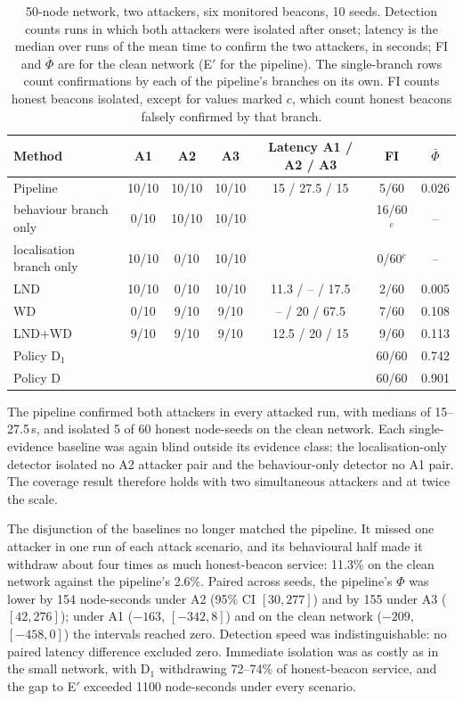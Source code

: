 \documentclass[pdflatex,sn-mathphys-num]{sn-jnl}%
\theoremstyle{thmstyleone}%
\theoremstyle{thmstyletwo}%
\theoremstyle{thmstylethree}%
\begin{document}
\begin{table}[!t]
\caption{50-node network, two attackers, six monitored beacons, 10 seeds.
Detection counts runs in which both attackers were isolated after onset;
latency is the median over runs of the mean time to confirm the two
attackers, in seconds; FI and $\bar\Phi$ are for the clean network (E$'$ for
the pipeline). The single-branch rows count confirmations by each of the
pipeline's branches on its own. FI counts honest beacons isolated, except for
values marked $c$, which count honest beacons falsely confirmed by that
branch.}
\label{tab:scale}
\centering
\footnotesize
\setlength{\tabcolsep}{4pt}
\begin{tabular}{@{}lcccccc@{}}
\toprule
Method & A1 & A2 & A3 & Latency A1 / A2 / A3 & FI & $\bar\Phi$ \\
\midrule
Pipeline & 10/10 & 10/10 & 10/10 & 15 / 27.5 / 15 & 5/60 & 0.026 \\
\quad behaviour branch only & 0/10 & 10/10 & 10/10 & & 16/60$^{c}$ & -- \\
\quad localisation branch only & 10/10 & 0/10 & 10/10 & & 0/60$^{c}$ & -- \\
LND & 10/10 & 0/10 & 10/10 & 11.3 / -- / 17.5 & 2/60 & 0.005 \\
WD & 0/10 & 9/10 & 9/10 & -- / 20 / 67.5 & 7/60 & 0.108 \\
LND+WD & 9/10 & 9/10 & 9/10 & 12.5 / 20 / 15 & 9/60 & 0.113 \\
Policy D$_1$ & & & & & 60/60 & 0.742 \\
Policy D & & & & & 60/60 & 0.901 \\
\bottomrule
\end{tabular}
\end{table}

The pipeline confirmed both attackers in every attacked run, with medians of
15--27.5\,s, and isolated 5 of 60 honest node-seeds on the clean network.
Each single-evidence baseline was again blind outside its evidence class:
the localisation-only detector isolated no A2 attacker pair and the
behaviour-only detector no A1 pair. The coverage result therefore holds with
two simultaneous attackers and at twice the scale.

The disjunction of the baselines no longer matched the pipeline. It missed
one attacker in one run of each attack scenario, and its behavioural half
made it withdraw about four times as much honest-beacon service: 11.3\% on
the clean network against the pipeline's 2.6\%. Paired across
seeds, the pipeline's $\Phi$ was lower by 154 node-seconds under A2 (95\% CI
$[30, 277]$) and by 155 under A3 ($[42, 276]$); under A1 ($-163$,
$[-342, 8]$) and on the clean network ($-209$, $[-458, 0]$) the intervals
reached zero. Detection speed was indistinguishable: no paired latency
difference excluded zero. Immediate isolation was as costly as in the small
network, with D$_1$ withdrawing 72--74\% of honest-beacon service, and the
gap to E$'$ exceeded 1100 node-seconds under every scenario.
\end{document}
